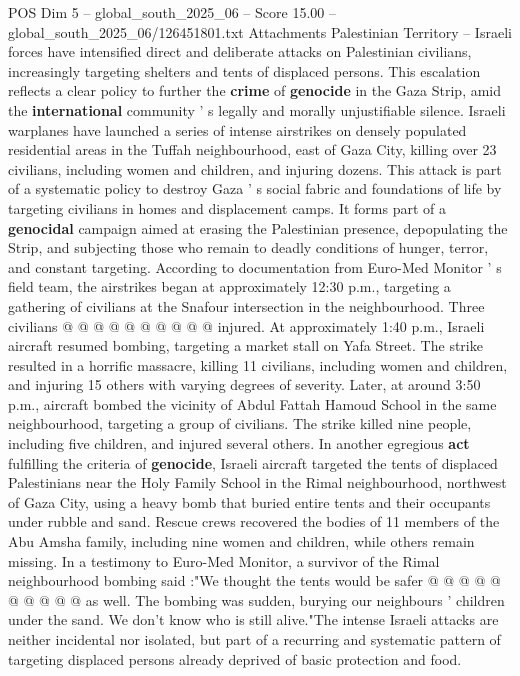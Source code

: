 \begin{textsample}{POS Dim 5 – global\_south\_2025\_06 – Score 15.00 – global\_south\_2025\_06/126451801.txt}  \label{ex:f5_pos_049}
Attachments Palestinian Territory -- Israeli forces have intensified direct and deliberate attacks on Palestinian civilians, increasingly targeting shelters and tents of displaced persons.
This escalation reflects a clear policy to further the \textbf{crime} of \textbf{genocide} in the Gaza Strip, amid the \textbf{international} community ' s legally and morally unjustifiable silence.
Israeli warplanes have launched a series of intense airstrikes on densely populated residential areas in the Tuffah neighbourhood, east of Gaza City, killing over 23 civilians, including women and children, and injuring dozens.
This attack is part of a systematic policy to destroy Gaza ' s social fabric and foundations of life by targeting civilians in homes and displacement camps.
It forms part of a \textbf{genocidal} campaign aimed at erasing the Palestinian presence, depopulating the Strip, and subjecting those who remain to deadly conditions of hunger, terror, and constant targeting.
According to documentation from Euro-Med Monitor ' s field team, the airstrikes began at approximately 12:30 p.m., targeting a gathering of civilians at the Snafour intersection in the neighbourhood.
Three civilians @ @ @ @ @ @ @ @ @ @ injured.
At approximately 1:40 p.m., Israeli aircraft resumed bombing, targeting a market stall on Yafa Street.
The strike resulted in a horrific massacre, killing 11 civilians, including women and children, and injuring 15 others with varying degrees of severity.
Later, at around 3:50 p.m., aircraft bombed the vicinity of Abdul Fattah Hamoud School in the same neighbourhood, targeting a group of civilians.
The strike killed nine people, including five children, and injured several others.
In another egregious \textbf{act} fulfilling the criteria of \textbf{genocide}, Israeli aircraft targeted the tents of displaced Palestinians near the Holy Family School in the Rimal neighbourhood, northwest of Gaza City, using a heavy bomb that buried entire tents and their occupants under rubble and sand.
Rescue crews recovered the bodies of 11 members of the Abu Amsha family, including nine women and children, while others remain missing.
In a testimony to Euro-Med Monitor, a survivor of the Rimal neighbourhood bombing said :"We thought the tents would be safer @ @ @ @ @ @ @ @ @ @ as well.
The bombing was sudden, burying our neighbours ' children under the sand.
We don't know who is still alive."The intense Israeli attacks are neither incidental nor isolated, but part of a recurring and systematic pattern of targeting displaced persons already deprived of basic protection and food.

\end{textsample}
